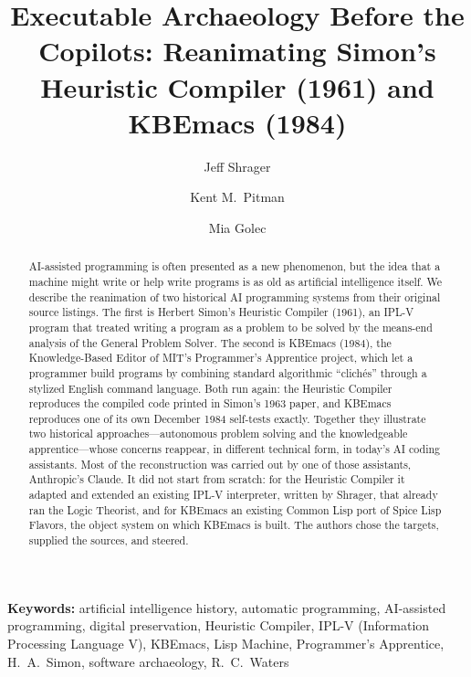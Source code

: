 \documentclass[11pt]{article}
\begin{document}
\title{Executable Archaeology Before the Copilots: Reanimating Simon's Heuristic Compiler (1961) and KBEmacs (1984)}

\author[1]{Jeff Shrager}
\author[2]{Kent M.~Pitman}
\author[3]{Mia Golec}
\date{}




\maketitle

\begin{abstract}
AI-assisted programming is often presented as a new phenomenon, but
the idea that a machine might write or help write programs is as old
as artificial intelligence itself. We describe the reanimation of two
historical AI programming systems from their original source listings.
The first is Herbert Simon's Heuristic Compiler (1961), an IPL-V
program that treated writing a program as a problem to be solved by
the means-end analysis of the General Problem Solver. The second is
KBEmacs (1984), the Knowledge-Based Editor of MIT's Programmer's
Apprentice project, which let a programmer build programs by combining
standard algorithmic ``clich\'es'' through a stylized English command
language. Both run again: the Heuristic Compiler reproduces the
compiled code printed in Simon's 1963 paper, and KBEmacs reproduces one
of its own December 1984 self-tests exactly. Together they illustrate
two historical approaches---autonomous problem solving and the
knowledgeable apprentice---whose concerns reappear, in different
technical form, in today's AI coding assistants. Most of
the reconstruction was carried out by one of those assistants,
Anthropic's Claude. It did not start from scratch: for the Heuristic
Compiler it adapted and extended an existing IPL-V interpreter, written
by Shrager, that already ran the Logic Theorist, and for KBEmacs an
existing Common Lisp port of Spice Lisp Flavors, the object system on
which KBEmacs is built. The authors chose the targets, supplied the
sources, and steered.
\end{abstract}

\noindent\textbf{Keywords:} artificial intelligence history, automatic programming, AI-assisted programming, digital preservation, Heuristic Compiler, IPL-V (Information Processing Language V), KBEmacs, Lisp Machine, Programmer's Apprentice, H.~A.~Simon, software archaeology, R.~C.~Waters
\end{document}
